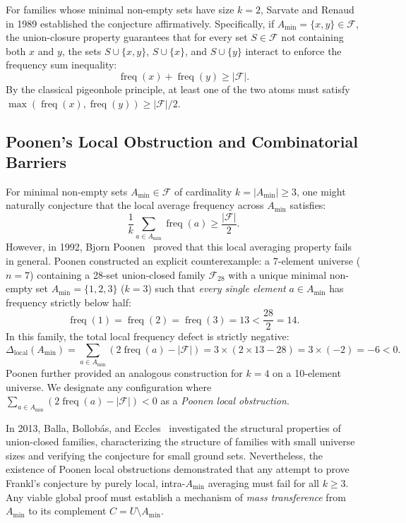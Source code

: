 \documentclass[11pt,a4paper]{article}
\theoremstyle{plain}
\theoremstyle{definition}
\theoremstyle{remark}
\newcommand{\F}{\mathcal{F}}
\newcommand{\freq}{\operatorname{freq}}
\begin{document}
For families whose minimal non-empty sets have size $k=2$, Sarvate and Renaud~\cite{sarvate1989} in 1989 established the conjecture affirmatively. Specifically, if $A_{\min} = \{x, y\} \in \F$, the union-closure property guarantees that for every set $S \in \F$ not containing both $x$ and $y$, the sets $S \cup \{x, y\}$, $S \cup \{x\}$, and $S \cup \{y\}$ interact to enforce the frequency sum inequality:
\begin{equation}
\freq(x) + \freq(y) \ge |\F|.
\end{equation}
By the classical pigeonhole principle, at least one of the two atoms must satisfy $\max(\freq(x), \freq(y)) \ge |\F|/2$.

\subsection{Poonen's Local Obstruction and Combinatorial Barriers}

For minimal non-empty sets $A_{\min} \in \F$ of cardinality $k = |A_{\min}| \ge 3$, one might naturally conjecture that the local average frequency across $A_{\min}$ satisfies:
\begin{equation}
\frac{1}{k} \sum_{a \in A_{\min}} \freq(a) \ge \frac{|\F|}{2}.
\end{equation}
However, in 1992, Bjorn Poonen~\cite{poonen1992} proved that this local averaging property fails in general. Poonen constructed an explicit counterexample: a 7-element universe ($n=7$) containing a 28-set union-closed family $\F_{28}$ with a unique minimal non-empty set $A_{\min} = \{1, 2, 3\}$ ($k=3$) such that \emph{every single element} $a \in A_{\min}$ has frequency strictly below half:
\begin{equation}
\freq(1) = \freq(2) = \freq(3) = 13 < \frac{28}{2} = 14.
\end{equation}
In this family, the total local frequency defect is strictly negative:
\begin{equation}
\Delta_{\text{local}}(A_{\min}) = \sum_{a \in A_{\min}} (2 \freq(a) - |\F|) = 3 \times (2 \times 13 - 28) = 3 \times (-2) = -6 < 0.
\end{equation}
Poonen further provided an analogous construction for $k=4$ on a 10-element universe. We designate any configuration where $\sum_{a \in A_{\min}} (2 \freq(a) - |\F|) < 0$ as a \emph{Poonen local obstruction}.

In 2013, Balla, Bollob\'as, and Eccles~\cite{balla2013} investigated the structural properties of union-closed families, characterizing the structure of families with small universe sizes and verifying the conjecture for small ground sets. Nevertheless, the existence of Poonen local obstructions demonstrated that any attempt to prove Frankl's conjecture by purely local, intra-$A_{\min}$ averaging must fail for all $k \ge 3$. Any viable global proof must establish a mechanism of \emph{mass transference} from $A_{\min}$ to its complement $C = U \setminus A_{\min}$.
\end{document}
